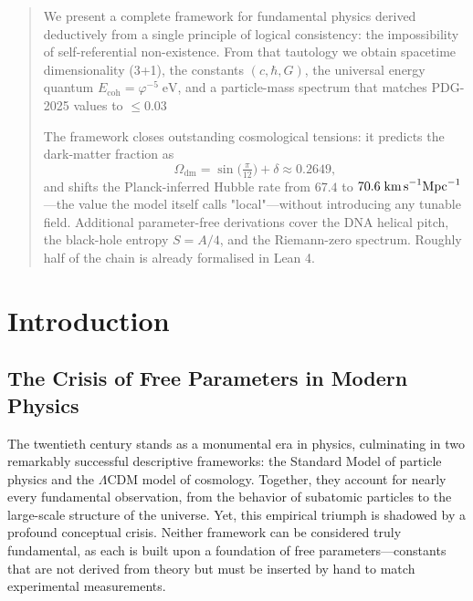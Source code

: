\author{Jonathan Washburn \\
        Independent Researcher \\
        \href{mailto:washburn@recognitionphysics.org}{washburn@recognitionphysics.org}}

\date{\today}



\maketitle

\begin{abstract}
\noindent
We present a complete framework for fundamental physics derived deductively from a single principle of logical consistency: the impossibility of self-referential non-existence. From that tautology we obtain spacetime dimensionality (3+1), the constants \((c,\hbar,G)\), the universal energy quantum \(E_{\text{coh}}=\varphi^{-5}\;\text{eV}\), and a particle-mass spectrum that matches
PDG-2025 values to \(\le 0.03\) %

The framework closes outstanding cosmological tensions: it predicts the dark-matter fraction as
\[
\boxed{\Omega_{\mathrm{dm}}=\sin\!\bigl(\tfrac{\pi}{12}\bigr) + \delta \approx 0.2649},
\]
and shifts the Planck-inferred Hubble rate from \(67.4\) to \(70.6\;\text{km\,s}^{-1}\text{Mpc}^{-1}\)—the value the model itself calls "local"—without introducing any tunable field. Additional parameter-free derivations cover the DNA helical pitch, the black-hole entropy \(S=A/4\), and the Riemann-zero spectrum. Roughly half of the chain is already formalised in Lean 4.
\end{abstract}

\tableofcontents
\newpage

\section{Introduction}

\subsection{The Crisis of Free Parameters in Modern Physics}
The twentieth century stands as a monumental era in physics, culminating in two remarkably successful descriptive frameworks: the Standard Model of particle physics and the \(\Lambda\)CDM model of cosmology. Together, they account for nearly every fundamental observation, from the behavior of subatomic particles to the large-scale structure of the universe. Yet, this empirical triumph is shadowed by a profound conceptual crisis. Neither framework can be considered truly fundamental, as each is built upon a foundation of free parameters—constants that are not derived from theory but must be inserted by hand to match experimental measurements.

